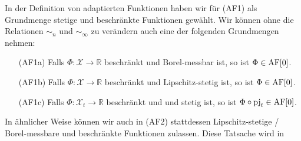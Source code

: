 \begin{remark}\label{thm:adapted_functions_base_change}
    In der Definition von adaptierten Funktionen haben wir für (AF1) als Grundmenge stetige und beschränkte Funktionen gewählt. Wir können ohne die Relationen $\sim_n$ und $\sim_\infty$ zu verändern auch eine der folgenden Grundmengen nehmen:
    \begin{itemize}
        \item[(AF1a)] Falls $\Phi: \mathcal{X}\rightarrow \mathbb{R}$ beschränkt und Borel-messbar ist, so ist $\Phi \in \operatorname{AF}[0]$.
        \item[(AF1b)] Falls $\Phi: \mathcal{X}\rightarrow \mathbb{R}$ beschränkt und Lipschitz-stetig ist, so ist $\Phi \in \operatorname{AF}[0]$.
        \item[(AF1c)] Falls $\Phi: \mathcal{X}_t\rightarrow \mathbb{R}$ beschränkt und und stetig ist, so ist $\Phi \circ \operatorname{pj}_t \in \operatorname{AF}[0]$.
    \end{itemize}
    In ähnlicher Weise können wir auch in (AF2) stattdessen Lipschitz-stetige / Borel-messbare und beschränkte Funktionen zulassen. Diese Tatsache wird in 
\end{remark}

